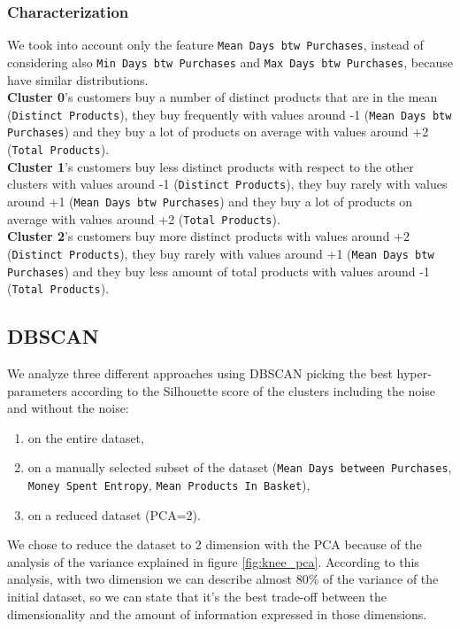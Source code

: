 \documentclass[12pt]{article}
\begin{document}
\subsubsection{Characterization}
We took into account only the feature \texttt{Mean Days btw Purchases}, instead of considering also \texttt{Min Days btw Purchases} and \texttt{Max Days btw Purchases}, because have similar distributions.\\
\textbf{Cluster 0}'s customers buy a number of distinct products that are in the mean (\texttt{Distinct Products}), they buy frequently with values around -1 (\texttt{Mean Days btw Purchases}) and they buy a lot of products on average with values around +2 (\texttt{Total Products}).\\
\textbf{Cluster 1}'s customers buy less distinct products with respect to the other clusters with values around -1 (\texttt{Distinct Products}), they buy rarely with values around +1 (\texttt{Mean Days btw Purchases}) and they buy a lot of products on average with values around +2 (\texttt{Total Products}).\\
\textbf{Cluster 2}'s customers buy more distinct products with values around +2 (\texttt{Distinct Products}), they buy rarely with values around +1 (\texttt{Mean Days btw Purchases}) and they buy less amount of total products with values around -1 (\texttt{Total Products}).

\subsection{DBSCAN}
We analyze three different approaches using DBSCAN picking the best hyper-parameters according to the Silhouette score of the clusters including the noise and without the noise:
\begin{enumerate}
    \item on the entire dataset, 
    \item on a manually selected subset of the dataset (\texttt{Mean Days between Purchases}, \texttt{Money Spent Entropy}, \texttt{Mean Products In Basket}),
    \item on a reduced dataset (PCA=2). 
\end{enumerate}

We chose to reduce the dataset to 2 dimension with the PCA because of the analysis of the variance explained in figure \ref{fig:knee_pca}. According to this analysis, with two dimension we can describe almost 80\% of the variance of the initial dataset, so we can state that it's the best trade-off between the dimensionality and the amount of information expressed in those dimensions.
\end{document}
